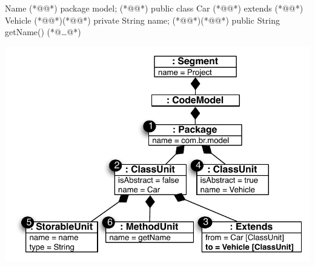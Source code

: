 
\noindent\begin{minipage}{.53\textwidth}
	\begin{codigo}[caption={[Parte de código Java para ilustrar como o KDM é usado para representar o código fonte.] Simples código em Java.},escapeinside={(*@}{@*)}, basicstyle=\footnotesize, label={lst:example_kdm_instance}]{Name}
	(*@@*) package model;
	(*@@*) public class Car (*@@*) extends  
	(*@@*) Vehicle{
	(*@@*)(*@@*) private String name;
	(*@@*)(*@@*) public String getName(){
	(*@\ldots @*)
	}
	}
	\end{codigo}
\end{minipage}\hfill
\begin{minipage}{.45\textwidth}
	\centering
	\includegraphics[scale=0.6]{images/kdm_instance_java_correspoding_2_with_extends}
	\fautor
	\label{fig:kdm_instance_Java}
\end{minipage}

